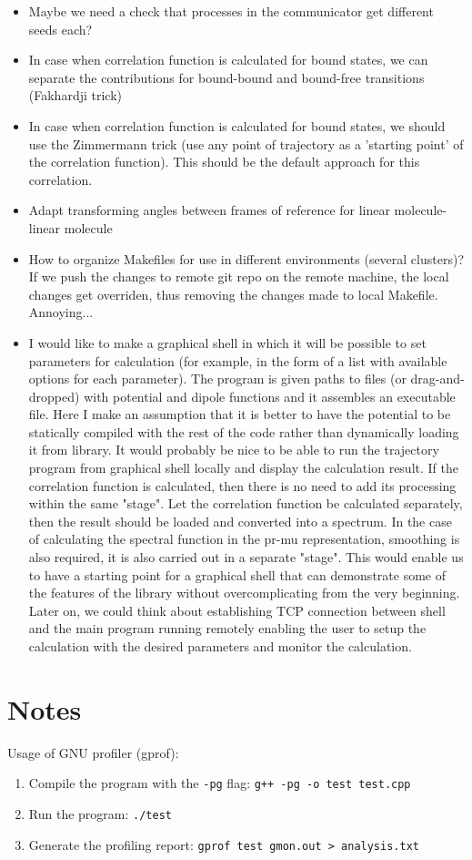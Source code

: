 \documentclass{article}
\begin{document}
\begin{itemize}
    \item Maybe we need a check that processes in the communicator get different seeds each?
    \item In case when correlation function is calculated for bound states, we can separate the contributions for bound-bound and bound-free transitions (Fakhardji trick)
    \item In case when correlation function is calculated for bound states, we should use the Zimmermann trick (use any point of trajectory as a 'starting point' of the correlation function). This should be the default approach for this correlation. 
    \item Adapt transforming angles between frames of reference for linear molecule-linear molecule
    \item How to organize Makefiles for use in different environments (several clusters)? If we push the changes to remote git repo on the remote machine, the local changes get overriden, thus removing the changes made to local Makefile. Annoying... 
    \item I would like to make a graphical shell in which it will be possible to set parameters for calculation (for example, in the form of a list with available options for each parameter). The program is given paths to files (or drag-and-dropped) with potential and dipole functions and it assembles an executable file. Here I make an assumption that it is better to have the potential to be statically compiled with the rest of the code rather than dynamically loading it from library. It would probably be nice to be able to run the trajectory program from graphical shell locally and display the calculation result. If the correlation function is calculated, then there is no need to add its processing within the same "stage". Let the correlation function be calculated separately, then the result should be loaded and converted into a spectrum. In the case of calculating the spectral function in the pr-mu representation, smoothing is also required, it is also carried out in a separate "stage". This would enable us to have a starting point for a graphical shell that can demonstrate some of the features of the library without overcomplicating from the very beginning. Later on, we could think about establishing TCP connection between shell and the main program running remotely enabling the user to setup the calculation with the desired parameters and monitor the calculation. 
\end{itemize}

\section{Notes}

Usage of GNU profiler (gprof):
\begin{enumerate}
    \item Compile the program with the \texttt{-pg} flag: \texttt{g++ -pg -o test test.cpp}
    \item Run the program: \texttt{./test}
    \item Generate the profiling report: \texttt{gprof test gmon.out > analysis.txt}
\end{enumerate}
\end{document}
